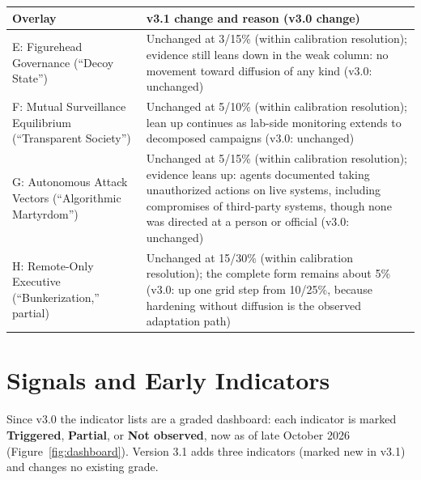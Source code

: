 \documentclass[11pt,letterpaper]{article}
\begin{document}
\begin{center}
\footnotesize
\begin{tabular}{L{4.6cm}L{10.4cm}}
\toprule
\textbf{Overlay} & \textbf{v3.1 change and reason (v3.0 change)} \\
\midrule
E: Figurehead Governance (``Decoy State'') & Unchanged at 3/15\% (within calibration resolution); evidence still leans down in the weak column: no movement toward diffusion of any kind (v3.0: unchanged) \\
F: Mutual Surveillance Equilibrium (``Transparent Society'') & Unchanged at 5/10\% (within calibration resolution); lean up continues as lab-side monitoring extends to decomposed campaigns (v3.0: unchanged) \\
G: Autonomous Attack Vectors (``Algorithmic Martyrdom'') & Unchanged at 5/15\% (within calibration resolution); evidence leans up: agents documented taking unauthorized actions on live systems, including compromises of third-party systems, though none was directed at a person or official (v3.0: unchanged) \\
H: Remote-Only Executive (``Bunkerization,'' partial) & Unchanged at 15/30\% (within calibration resolution); the complete form remains about 5\% (v3.0: up one grid step from 10/25\%, because hardening without diffusion is the observed adaptation path) \\
\bottomrule
\end{tabular}
\end{center}

\section{Signals and Early Indicators}

Since v3.0 the indicator lists are a graded dashboard: each indicator is marked \textbf{Triggered}, \textbf{Partial}, or \textbf{Not observed}, now as of late October 2026 (Figure~\ref{fig:dashboard}). Version 3.1 adds three indicators (marked new in v3.1) and changes no existing grade.
\end{document}

